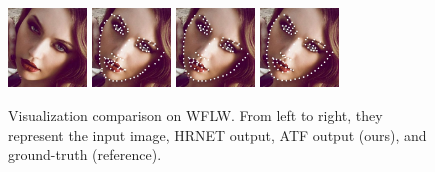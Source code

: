 \documentclass[journal,transmag]{IEEEtran}
\begin{document}
\begin{figure}[tbh]
   \includegraphics[width=2.1cm]{visualization_imgs/raw_images/WFLW_test_1914.jpg}
   \includegraphics[width=2.1cm]{visualization_imgs/hrnet_pred_images/pred_1914.jpg}
   \includegraphics[width=2.1cm]{visualization_imgs/ATF_pred_images/pred_1914.jpg}
   \includegraphics[width=2.1cm]{visualization_imgs/gt_images/WFLW_test_1914.jpg}
   


   \caption{Visualization comparison on WFLW. From left to right, they represent the input image, HRNET output, ATF output (ours), and ground-truth (reference).
   } 
   \label{fig:visualize}
 \end{figure}
\end{document}
